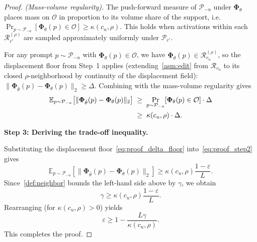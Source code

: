 \begin{proof}
\smallskip
\noindent\emph{(Mass-volume regularity).} The push-forward measure of $\mathcal{P}_{-u}$ under $\boldsymbol{\Phi}_\theta$ places mass on $\mathcal{O}$ in proportion to its volume share of the support, i.e.\ $\Pr_{p\sim\mathcal{P}_{-u}}[\boldsymbol{\Phi}_\theta(p) \in \mathcal{O}] \geq \kappa(c_u,\rho)$. This holds when activations within each $\mathcal{R}_{c'}^{(\rho)}$ are sampled approximately uniformly under $\mathcal{P}_{c'}$.
\smallskip

For any prompt $p\sim\mathcal{P}_{-u}$ with $\boldsymbol{\Phi}_\theta(p)\in\mathcal{O}$, we have $\boldsymbol{\Phi}_\theta(p)\in\mathcal{R}_{c_u}^{(\rho)}$, so the displacement floor from Step~1 applies (extending~\cref{asm:edit} from $\mathcal{R}_{c_u}$ to its closed $\rho$-neighborhood by continuity of the displacement field): $\|\boldsymbol{\Phi}_{\hat\theta}(p)-\boldsymbol{\Phi}_\theta(p)\|_2 \geq \Delta$. Combining with the mass-volume regularity gives
\begin{align}
    \mathbb{E}_{p\sim \mathcal{P}_{-u}}
    \!\left[\|\boldsymbol{\Phi}_{\hat{\theta}}(p)-\boldsymbol{\Phi}_{\theta}(p)\|_2\right]
    &\;\geq\; \Pr_{p\sim\mathcal{P}_{-u}}\!\left[\boldsymbol{\Phi}_\theta(p)\in\mathcal{O}\right]\cdot\Delta \notag\\
    &\;\geq\; \kappa(c_u,\rho)\cdot\Delta. \label{eq:proof_step2}
\end{align}

\medskip
\noindent\textbf{Step 3: Deriving the trade-off inequality.}

Substituting the displacement floor~\eqref{eq:proof_delta_floor} into~\eqref{eq:proof_step2} gives
\begin{equation}
    \mathbb{E}_{p\sim \mathcal{P}_{-u}}
    \left[
    \|\boldsymbol{\Phi}_{\hat{\theta}}(p)-\boldsymbol{\Phi}_{\theta}(p)\|_2
    \right]
    \geq
    \kappa(c_u,\rho)\frac{1-\varepsilon}{L}.
\end{equation}
Since~\cref{def:neighbor} bounds the left-hand side above by $\gamma$, we obtain
\begin{equation}
    \gamma
    \geq
    \kappa(c_u,\rho)\frac{1-\varepsilon}{L}.
\end{equation}
Rearranging (for $\kappa(c_u,\rho) > 0$) yields
\begin{equation}
    \varepsilon
    \geq
    1-\frac{L\gamma}{\kappa(c_u,\rho)}.
\end{equation}
This completes the proof.
\end{proof}



